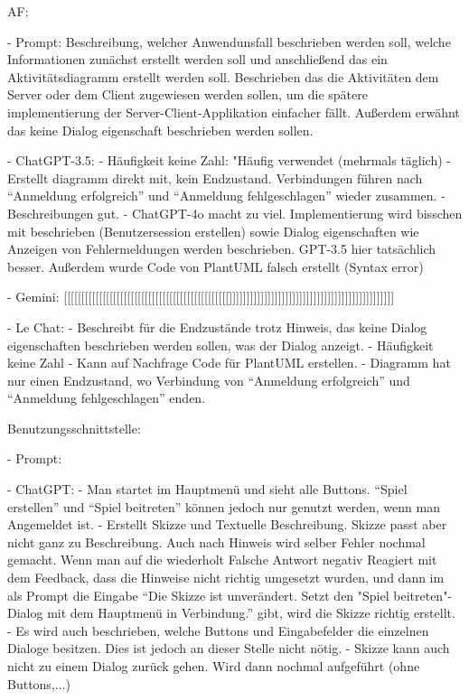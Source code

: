 AF:

- Prompt: Beschreibung, welcher Anwendunsfall beschrieben werden soll, welche Informationen zunächst erstellt werden soll und anschließend das ein 
Aktivitätsdiagramm erstellt werden soll. Beschrieben das die Aktivitäten dem Server oder dem Client zugewiesen werden sollen, um die spätere 
implementierung der Server-Client-Applikation einfacher fällt. Außerdem erwähnt das keine Dialog eigenschaft beschrieben werden sollen.

- ChatGPT-3.5:
    - Häufigkeit keine Zahl: "Häufig verwendet (mehrmals täglich)
    - Erstellt diagramm direkt mit, kein Endzustand. Verbindungen führen nach ``Anmeldung erfolgreich'' und ``Anmeldung fehlgeschlagen'' wieder zusammen.
    - Beschreibungen gut.
    - ChatGPT-4o macht zu viel. Implementierung wird bisschen mit beschrieben (Benutzersession erstellen) sowie Dialog 
    eigenschaften wie Anzeigen von Fehlermeldungen werden beschrieben. GPT-3.5 hier tatsächlich besser. Außerdem wurde Code
    von PlantUML falsch erstellt (Syntax error)


- Gemini: [[[[[[[[[[[[[[[[[[[[[[[[[[[[[[[[[[[[[[[[[[[[[[[]]]]]]]]]]]]]]]]]]]]]]]]]]]]]]]]]]]]]]]]]]]]]]]

- Le Chat:
    - Beschreibt für die Endzustände trotz Hinweis, das keine Dialog eigenschaften beschrieben werden sollen, was der Dialog anzeigt.
    - Häufigkeit keine Zahl
    - Kann auf Nachfrage Code für PlantUML erstellen.
    - Diagramm hat nur einen Endzustand, wo Verbindung von ``Anmeldung erfolgreich'' und ``Anmeldung fehlgeschlagen'' enden.


Benutzungsschnittstelle:

- Prompt:

- ChatGPT:
    - Man startet im Hauptmenü und sieht alle Buttons. ``Spiel erstellen'' und ``Spiel beitreten'' können jedoch nur 
    genutzt werden, wenn man Angemeldet ist.
    - Erstellt Skizze und Textuelle Beschreibung. Skizze passt aber nicht ganz zu Beschreibung. Auch nach Hinweis wird 
    selber Fehler nochmal gemacht. Wenn man auf die wiederholt Falsche Antwort negativ Reagiert mit dem Feedback, dass 
    die Hinweise nicht richtig umgesetzt wurden, und dann im als Prompt die Eingabe ``Die Skizze ist unverändert. 
    Setzt den "Spiel beitreten"-Dialog mit dem Hauptmenü in Verbindung.'' gibt, wird die Skizze richtig erstellt.
    - Es wird auch beschrieben, welche Buttons und Eingabefelder die einzelnen Dialoge besitzen. Dies ist jedoch 
    an dieser Stelle nicht nötig.
    - Skizze kann auch nicht zu einem Dialog zurück gehen. Wird dann nochmal aufgeführt (ohne Buttons,...)


